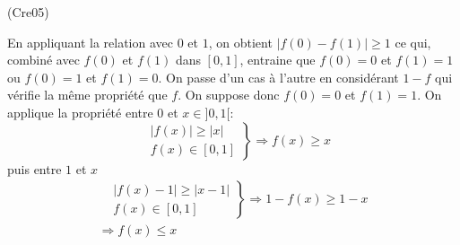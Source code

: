 \begin{tiny}(Cre05)\end{tiny} En appliquant la relation avec $0$ et $1$, on obtient $|f(0)-f(1)|\geq 1$ ce qui, combiné avec $f(0)$ et $f(1)$ dans $[0,1]$, entraine que $f(0)=0$ et $f(1)=1$ ou $f(0)=1$ et $f(1)=0$. On passe d'un cas à l'autre en considérant $1-f$ qui vérifie la même propriété que $f$.\newline
On suppose donc $f(0)=0$ et $f(1)=1$. On applique la propriété entre $0$ et $x\in]0,1[$:
\begin{displaymath}
\left. 
\begin{aligned}
 &|f(x)|\geq |x| \\
 & f(x)\in [0,1]
\end{aligned}
\right\rbrace 
\Rightarrow
f(x)\geq x
\end{displaymath}
puis entre $1$ et $x$
\begin{multline*}
\left. 
\begin{aligned}
 &|f(x) -1|\geq |x-1| \\
 & f(x)\in [0,1]
\end{aligned}
\right\rbrace 
\Rightarrow
1-f(x)\geq 1-x \\
\Rightarrow
f(x)\leq x 
\end{multline*}